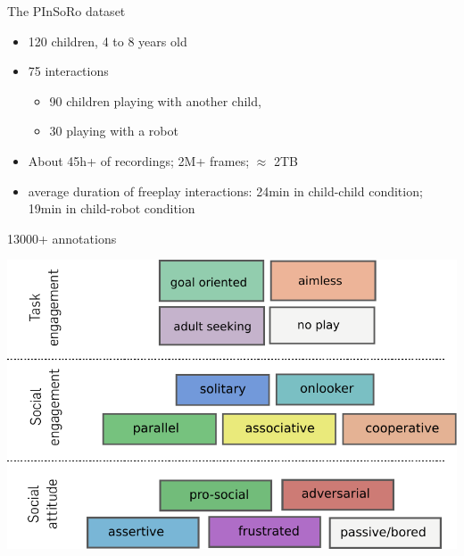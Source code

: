 \documentclass[xcolor=table]{beamer}
\begin{document}
{
\begin{frame}{The PInSoRo dataset}
    \begin{itemize}
        \item 120 children, 4 to 8 years old
        \item 75 interactions
            \begin{itemize}
                \item 90 children playing with another child, 
                \item 30 playing with a robot
            \end{itemize}
        \item About 45h+ of recordings; 2M+ frames; $\approx$ 2TB
         \item average duration of freeplay interactions: 24min in child-child
         condition; 19min in child-robot condition
    \end{itemize}

\end{frame}
}



\begin{frame}{13000+ annotations}
    \begin{center}
        \includegraphics[width=0.8\linewidth]{freeplay/coding-scheme}
    \end{center}
\end{frame}




\end{document}

